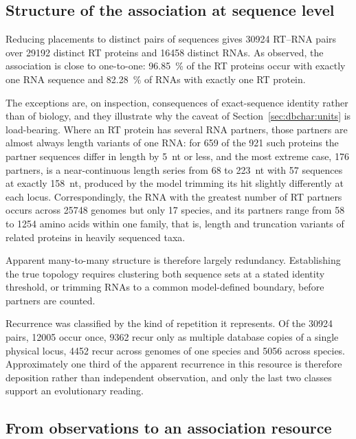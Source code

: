 \subsection{Structure of the association at sequence level}
\label{sec:dbchar:pairs}

Reducing placements to distinct pairs of sequences gives \num{30924} RT--RNA pairs over \num{29192}
distinct RT proteins and \num{16458} distinct RNAs. As observed, the association is close to
one-to-one: \SI{96.85}{\percent} of the RT proteins occur with exactly one RNA sequence and
\SI{82.28}{\percent} of RNAs with exactly one RT protein.

The exceptions are, on inspection, consequences of exact-sequence identity rather than of biology,
and they illustrate why the caveat of Section~\ref{sec:dbchar:units} is load-bearing. Where an RT
protein has several RNA partners, those partners are almost always length variants of one RNA: for
659 of the 921 such proteins the partner sequences differ in length by 5~nt or less, and the most
extreme case, 176 partners, is a near-continuous length series from 68 to 223~nt with 57 sequences
at exactly 158~nt, produced by the model trimming its hit slightly differently at each locus.
Correspondingly, the RNA with the greatest number of RT partners occurs across \num{25748} genomes
but only 17 species, and its partners range from 58 to \num{1254} amino acids within one family,
that is, length and truncation variants of related proteins in heavily sequenced taxa.

Apparent many-to-many structure is therefore largely redundancy. Establishing the true topology
requires clustering both sequence sets at a stated identity threshold, or trimming RNAs to a common
model-defined boundary, before partners are counted.

Recurrence was classified by the kind of repetition it represents. Of the \num{30924} pairs,
\num{12005} occur once, \num{9362} recur only as multiple database copies of a single physical
locus, \num{4452} recur across genomes of one species and \num{5056} across species. Approximately
one third of the apparent recurrence in this resource is therefore deposition rather than
independent observation, and only the last two classes support an evolutionary reading.

\subsection{From observations to an association resource}
\label{sec:dbchar:dataset}

